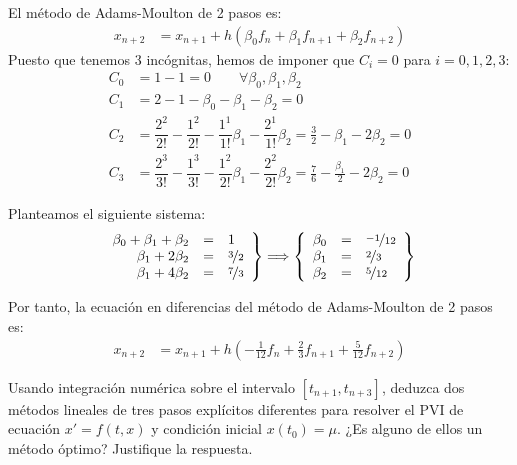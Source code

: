 \begin{ejercicio}
    El método de Adams-Moulton de 2 pasos es:
    \begin{align*}
        x_{n+2} &= x_{n+1} + h\left(\beta_0 f_n + \beta_1 f_{n+1}+ \beta_2 f_{n+2}\right)
    \end{align*}
    Puesto que tenemos $3$ incógnitas, hemos de imponer que $C_i=0$ para $i=0,1,2,3$:
    \begin{align*}
        C_0 &= 1 -1 = 0\qquad \forall \beta_0, \beta_1, \beta_2\\
        C_1 &= 2-1 - \beta_0 - \beta_1 - \beta_2 = 0\\
        C_2 &= \dfrac{2^2}{2!} - \dfrac{1^2}{2!} - \dfrac{1^1}{1!}\beta_1 - \dfrac{2^1}{1!}\beta_2 = \frac{3}{2} - \beta_1 - 2\beta_2 = 0\\
        C_3 &= \dfrac{2^3}{3!} - \dfrac{1^3}{3!} - \dfrac{1^2}{2!}\beta_1 - \dfrac{2^2}{2!}\beta_2 = \frac{7}{6} - \frac{\beta_1}{2} - 2\beta_2 = 0
    \end{align*}

    Planteamos el siguiente sistema:
    \begin{equation*}
        \left.
            \begin{array}{rcl}
                \beta_0 + \beta_1 + \beta_2 &=& 1\\
                \beta_1 + 2\beta_2 &=& \nicefrac{3}{2}\\
                \beta_1 + 4\beta_2 &=& \nicefrac{7}{3}\\
            \end{array}
        \right\}
        \Longrightarrow
        \left\{
            \begin{array}{rcl}
                \beta_0 &=& \nicefrac{-1}{12}\\
                \beta_1 &=& \nicefrac{2}{3}\\
                \beta_2 &=& \nicefrac{5}{12}
            \end{array}
        \right\}
    \end{equation*}

    Por tanto, la ecuación en diferencias del método de Adams-Moulton de 2 pasos es:
    \begin{align*}
        x_{n+2} &= x_{n+1} + h\left(-\frac{1}{12} f_n + \frac{2}{3} f_{n+1} + \frac{5}{12} f_{n+2}\right)
    \end{align*}
\end{ejercicio}

\begin{ejercicio}\label{ej:3.1.15}
    Usando integración numérica sobre el intervalo $[t_{n+1}, t_{n+3}]$, deduzca dos métodos lineales de tres pasos explícitos diferentes para resolver el PVI de ecuación $x' = f(t, x)$ y condición inicial $x(t_0) = \mu$. ¿Es alguno de ellos un método óptimo? Justifique la respuesta.
\end{ejercicio}

